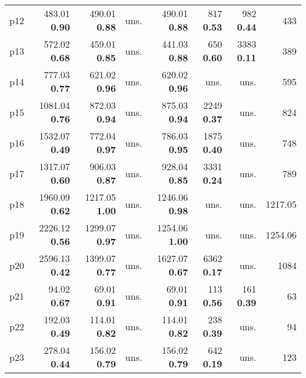 \begin{tabular}{|l|rrrrrr|r|}
p12 & {\footnotesize 483.01} \textbf{0.90} & {\footnotesize 490.01} \textbf{0.88} & uns. & {\footnotesize 490.01} \textbf{0.88} & {\footnotesize 817} \textbf{0.53} & {\footnotesize 982} \textbf{0.44} & 433\\
p13 & {\footnotesize 572.02} \textbf{0.68} & {\footnotesize 459.01} \textbf{0.85} & uns. & {\footnotesize 441.03} \textbf{0.88} & {\footnotesize 650} \textbf{0.60} & {\footnotesize 3383} \textbf{0.11} & 389\\
p14 & {\footnotesize 777.03} \textbf{0.77} & {\footnotesize 621.02} \textbf{0.96} & uns. & {\footnotesize 620.02} \textbf{0.96} & uns. & uns. & 595\\
p15 & {\footnotesize 1081.04} \textbf{0.76} & {\footnotesize 872.03} \textbf{0.94} & uns. & {\footnotesize 875.03} \textbf{0.94} & {\footnotesize 2249} \textbf{0.37} & uns. & 824\\
p16 & {\footnotesize 1532.07} \textbf{0.49} & {\footnotesize 772.04} \textbf{0.97} & uns. & {\footnotesize 786.03} \textbf{0.95} & {\footnotesize 1875} \textbf{0.40} & uns. & 748\\
p17 & {\footnotesize 1317.07} \textbf{0.60} & {\footnotesize 906.03} \textbf{0.87} & uns. & {\footnotesize 928.04} \textbf{0.85} & {\footnotesize 3331} \textbf{0.24} & uns. & 789\\
p18 & {\footnotesize 1960.09} \textbf{0.62} & {\footnotesize 1217.05} \textbf{1.00} & uns. & {\footnotesize 1246.06} \textbf{0.98} & uns. & uns. & 1217.05\\
p19 & {\footnotesize 2226.12} \textbf{0.56} & {\footnotesize 1299.07} \textbf{0.97} & uns. & {\footnotesize 1254.06} \textbf{1.00} & uns. & uns. & 1254.06\\
p20 & {\footnotesize 2596.13} \textbf{0.42} & {\footnotesize 1399.07} \textbf{0.77} & uns. & {\footnotesize 1627.07} \textbf{0.67} & {\footnotesize 6362} \textbf{0.17} & uns. & 1084\\
p21 & {\footnotesize 94.02} \textbf{0.67} & {\footnotesize 69.01} \textbf{0.91} & uns. & {\footnotesize 69.01} \textbf{0.91} & {\footnotesize 113} \textbf{0.56} & {\footnotesize 161} \textbf{0.39} & 63\\
p22 & {\footnotesize 192.03} \textbf{0.49} & {\footnotesize 114.01} \textbf{0.82} & uns. & {\footnotesize 114.01} \textbf{0.82} & {\footnotesize 238} \textbf{0.39} & uns. & 94\\
p23 & {\footnotesize 278.04} \textbf{0.44} & {\footnotesize 156.02} \textbf{0.79} & uns. & {\footnotesize 156.02} \textbf{0.79} & {\footnotesize 642} \textbf{0.19} & uns. & 123\\

\end{tabular}
